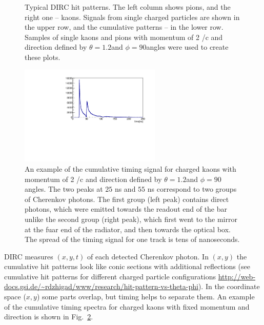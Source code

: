 \begin{figure}[!h]
\caption{\label{pic:hitpat1}
Typical \gluex DIRC hit patterns. The left column shows pions, and the right one -- kaons. 
Signals from single charged particles are shown in the upper row, and the cumulative patterns -- in the lower row.
Samples of single kaons and pions with momentum of 2 {\gev}/c and direction defined by $\theta = 1.2$\mydeg and $\phi = 90$\mydeg angles were used to create these plots.
}
\end{figure}

\begin{figure}[!h]
\centering
\includegraphics[angle=0,width=0.6\textwidth]{pics/Npho_th1_2_ph90.pdf}
\caption{\label{pic:time}
An example of the cumulative timing signal for charged kaons with momentum of 2 {\gev}/c and direction defined by $\theta = 1.2$\mydeg and $\phi = 90$\mydeg angles. The two peaks at $25$ ns and $55$ ns correspond to two groups of Cherenkov photons. The first group (left peak) contains direct photons, which were emitted towards the readout end of the bar unlike the second group (right peak), which first went to the mirror at the fuar end of the radiator, and then towards the optical box. The spread of the timing signal for one track is tens of nanoseconds. 
}
\end{figure}

DIRC measures $(x,y,t)$ of each detected Cherenkov photon. In $(x,y)$ the cumulative hit patterns look like conic sections with additional reflections (see cumulative hit patterns for different charged particle configurations \url{http://web-docs.gsi.de/~rdzhigad/www/research/hit-pattern-vs-theta-phi}). In the coordinate space ($x ,y$) some parts overlap, but timing helps to separate them.
An example of the cumulative timing spectra for charged kaons with fixed momentum and direction is shown in Fig.~\ref{pic:time}. 


